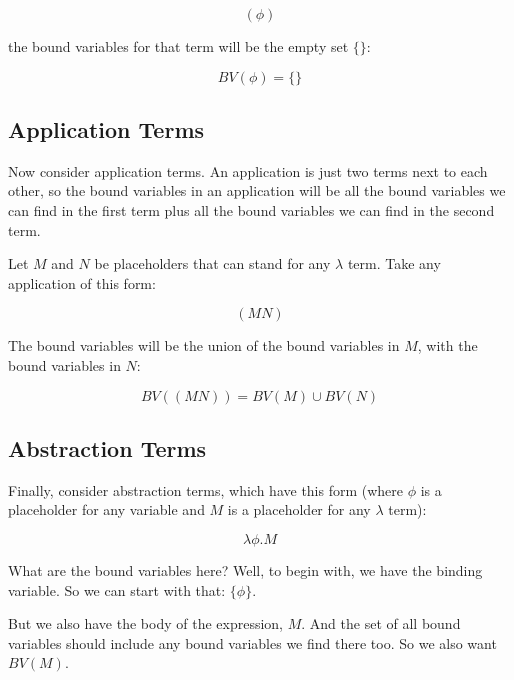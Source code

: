 \documentclass{book}
\numberwithin{equation}{chapter}
\begin{document}
\begin{equation}
(\phi)
\end{equation}

\noindent
the bound variables for that term will be the empty set $\{ \}$:

\begin{equation}
BV(\phi) = \{ \}
\end{equation}


\subsection{Application Terms}

Now consider application terms. An application is just two terms next to each other, so the bound variables in an application will be all the bound variables we can find in the first term plus all the bound variables we can find in the second term.

Let $M$ and $N$ be placeholders that can stand for any $\lambda$ term. Take any application of this form:

\begin{equation}
(M N)
\end{equation}

\noindent
The bound variables will be the union of the bound variables in $M$, with the bound variables in $N$:

\begin{equation}
BV((M N)) = BV(M) \cup BV(N)
\end{equation}


\subsection{Abstraction Terms}

Finally, consider abstraction terms, which have this form (where $\phi$ is a placeholder for any variable and $M$ is a placeholder for any $\lambda$ term):

\begin{equation}
\lambda \phi.M
\end{equation}

\noindent
What are the bound variables here? Well, to begin with, we have the binding variable. So we can start with that: $\{ \phi \}$.

But we also have the body of the expression, $M$. And the set of all bound variables should include any bound variables we find there too. So we also want $BV(M)$. 
\end{document}

